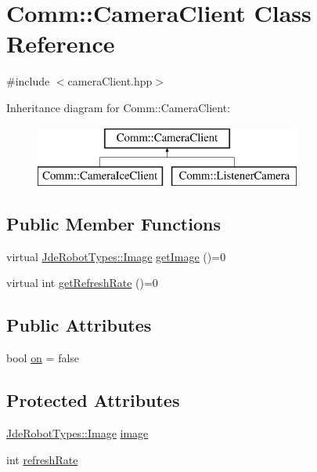 \hypertarget{class_comm_1_1_camera_client}{}\section{Comm\+:\+:Camera\+Client Class Reference}
\label{class_comm_1_1_camera_client}


{\ttfamily \#include $<$camera\+Client.\+hpp$>$}

Inheritance diagram for Comm\+:\+:Camera\+Client\+:\begin{figure}[H]
\begin{center}
\leavevmode
\includegraphics[height=2.000000cm]{class_comm_1_1_camera_client}
\end{center}
\end{figure}
\subsection*{Public Member Functions}
\begin{DoxyCompactItemize}
\item 
virtual \hyperlink{class_jde_robot_types_1_1_image}{Jde\+Robot\+Types\+::\+Image} \hyperlink{class_comm_1_1_camera_client_a1947976aa6b31734b9938091e63782e2}{get\+Image} ()=0
\item 
virtual int \hyperlink{class_comm_1_1_camera_client_afa8d54f4d72921376ec35607897ab5bc}{get\+Refresh\+Rate} ()=0
\end{DoxyCompactItemize}
\subsection*{Public Attributes}
\begin{DoxyCompactItemize}
\item 
bool \hyperlink{class_comm_1_1_camera_client_a72b2845560d1aa56b52cd8d8c191645a}{on} = false
\end{DoxyCompactItemize}
\subsection*{Protected Attributes}
\begin{DoxyCompactItemize}
\item 
\hyperlink{class_jde_robot_types_1_1_image}{Jde\+Robot\+Types\+::\+Image} \hyperlink{class_comm_1_1_camera_client_a401c8c553be78d6479668490768d5d72}{image}
\item 
int \hyperlink{class_comm_1_1_camera_client_ac5499dca33e4d1bfd11f1ad1143bc8f6}{refresh\+Rate}
\end{DoxyCompactItemize}



